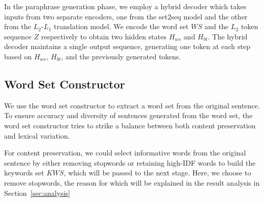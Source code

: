 
In the paraphrase generation phase, we employ a hybrid decoder 
which takes inputs from two separate encoders, one from the set2seq model 
and the other from the $L_2$-$L_1$ translation model. 
We encode the word set $WS$ and the $L_2$ token sequence $Z$ respectively 
to obtain two hidden states $H_{ws}$ and $H_{bt}$. The hybrid decoder 
maintains a single output sequence, generating one token at each step 
based on $H_{ws}$, $H_{bt}$, and the previously generated tokens.


\subsection{Word Set Constructor} \label{sec:wordset}
We use the word set constructor to extract a word set from the original sentence. To ensure accuracy and diversity of sentences generated from the word set, the word set constructor tries to strike a balance between both 
content preservation and lexical variation.

For content preservation, we could select informative words from the original 
sentence by either removing stopwords or retaining high-IDF words to build the 
keywords set $KWS$, which will be passed to the next stage. 
Here, we choose to remove stopwords, the reason for which will be
explained in the result analysis in Section~\ref{sec:analysis}

